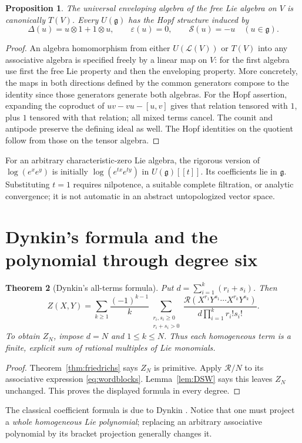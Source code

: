 \documentclass[11pt]{article}
\newtheorem{theorem}{Theorem}[section]
\newtheorem{proposition}[theorem]{Proposition}
\theoremstyle{definition}
\theoremstyle{remark}
\newcommand{\g}{\mathfrak g}
\newcommand{\Lie}{\mathcal L}
\newcommand{\eps}{\varepsilon}
\newcommand{\Rbr}{\mathcal R}
\numberwithin{equation}{section}
\begin{document}
\begin{proposition}\label{prop:enveloping}
The universal enveloping algebra of the free Lie algebra on $V$ is canonically $T(V)$. Every $U(\g)$ has the Hopf structure induced by
\[
 \Delta(u)=u\otimes1+1\otimes u,\qquad
 \eps(u)=0,\qquad \mathcal S(u)=-u\quad(u\in\g).
\]
\end{proposition}
\begin{proof}
An algebra homomorphism from either $U(\Lie(V))$ or $T(V)$ into any associative algebra is specified freely by a linear map on $V$: for the first algebra use first the free Lie property and then the enveloping property. More concretely, the maps in both directions defined by the common generators compose to the identity since those generators generate both algebras. For the Hopf assertion, expanding the coproduct of $uv-vu-[u,v]$ gives that relation tensored with $1$, plus $1$ tensored with that relation; all mixed terms cancel. The counit and antipode preserve the defining ideal as well. The Hopf identities on the quotient follow from those on the tensor algebra.
\end{proof}
For an arbitrary characteristic-zero Lie algebra, the rigorous version of $\log(e^xe^y)$ is initially $\log(e^{tx}e^{ty})$ in $U(\g)[[t]]$. Its coefficients lie in $\g$. Substituting $t=1$ requires nilpotence, a suitable complete filtration, or analytic convergence; it is not automatic in an abstract untopologized vector space.

\section{Dynkin's formula and the polynomial through degree six}\label{sec:dynkin}
\begin{theorem}[Dynkin's all-terms formula]\label{thm:dynkin}
Put $d=\sum_{i=1}^k(r_i+s_i)$. Then
\begin{equation}\label{eq:dynkin}
 \boxed{
 Z(X,Y)=\sum_{k\geq1}\frac{(-1)^{k-1}}{k}
 \sum_{\substack{r_i,s_i\geq0\\r_i+s_i>0}}
 \frac{\Rbr(X^{r_1}Y^{s_1}\cdots X^{r_k}Y^{s_k})}
      {d\prod_{i=1}^k r_i!s_i!}.}
\end{equation}
To obtain $Z_N$, impose $d=N$ and $1\leq k\leq N$. Thus each homogeneous term is a finite, explicit sum of rational multiples of Lie monomials.
\end{theorem}
\begin{proof}
Theorem~\ref{thm:friedrichs} says $Z_N$ is primitive. Apply $\Rbr/N$ to its associative expression \eqref{eq:wordblocks}. Lemma~\ref{lem:DSW} says this leaves $Z_N$ unchanged. This proves the displayed formula in every degree.
\end{proof}
The classical coefficient formula is due to Dynkin \cite{dynkin}. Notice that one must project a \emph{whole homogeneous Lie polynomial}; replacing an arbitrary associative polynomial by its bracket projection generally changes it.
\end{document}
